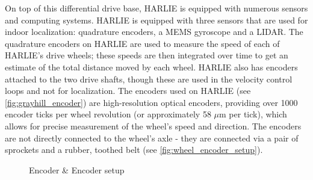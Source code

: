 On top of this differential drive base, HARLIE is equipped with numerous sensors and computing systems. HARLIE is equipped with three sensors that are used for indoor localization: quadrature encoders, a MEMS gyroscope and a LIDAR. The quadrature encoders on HARLIE are used to measure the speed of each of HARLIE's drive wheels; these speeds are then integrated over time to get an estimate of the total distance moved by each wheel. HARLIE also has encoders attached to the two drive shafts, though these are used in the velocity control loops and not for localization. The encoders used on HARLIE (see \autoref{fig:grayhill_encoder}) are high-resolution optical encoders, providing over 1000 encoder ticks per wheel revolution (or approximately 58 $\mu$m per tick), which allows for precise measurement of the wheel's speed and direction. The encoders are not directly connected to the wheel's axle - they are connected via a pair of sprockets and a rubber, toothed belt (see \autoref{fig:wheel_encoder_setup}).

\begin{figure}
\centering
{}
\hfill
{}
\caption{Encoder \& Encoder setup}
\label{fig:encoder_and_setup}
\end{figure}

